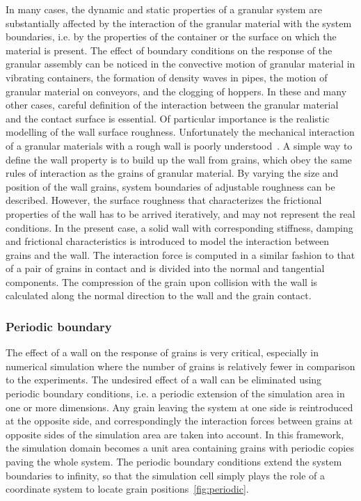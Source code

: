In many cases, the dynamic and static properties of a granular system are 
substantially affected by the interaction of the granular material with the 
system boundaries, i.e. by the properties of the container or the surface on 
which the material is present. The effect of boundary conditions on 
the response of the granular assembly can be noticed in the convective motion 
of granular material in vibrating containers, the formation of density waves in 
pipes, the motion of granular material on conveyors, and the clogging of 
hoppers. In these and many other cases, careful definition of the interaction 
between the granular material and the contact surface is essential. Of 
particular importance is the realistic modelling of the wall surface roughness. 
Unfortunately the mechanical interaction of a granular materials with a rough 
wall is poorly understood~\citep{Poschel2005}. A simple way to define the wall 
property is to build up the wall from grains, which obey the same rules of 
interaction as the grains of granular material. By varying the size and 
position of the wall grains, system boundaries of adjustable roughness can be 
described. However, the surface roughness that characterizes the frictional 
properties of the wall has to be arrived iteratively, and may not represent the 
real conditions. In the present case, a solid wall with corresponding 
stiffness, damping and frictional characteristics is introduced to model the 
interaction between grains and the wall. The interaction force is computed in a 
similar fashion to that of a pair of grains in contact and is divided into the 
normal and tangential components. The compression of the grain upon collision 
with the wall is calculated along the normal direction to the wall and 
the grain contact.

\subsubsection{Periodic boundary} \label{sec:periodic}
The effect of a wall on the response of grains is very critical, especially 
in numerical simulation where the number of grains is relatively fewer in 
comparison to the experiments. The undesired effect of a wall can be eliminated 
using periodic boundary conditions, i.e. a periodic extension of the simulation 
area in one or more dimensions. Any grain leaving the system at one side is 
reintroduced at the opposite side, and correspondingly the interaction 
forces between grains at opposite sides of the simulation area are taken into 
account. In this framework, the simulation domain becomes a unit area 
containing grains with periodic copies paving the whole system. The periodic 
boundary conditions extend the system boundaries to infinity, so that the 
simulation cell simply plays the role of a coordinate system to locate grain 
positions~\ref{fig:periodic}. 

